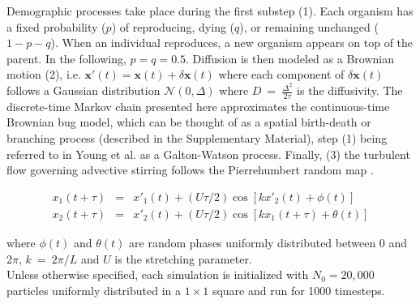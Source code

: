 Demographic processes take place during the first substep (1). Each organism has a fixed probability ($p$) of reproducing, dying ($q$), or remaining unchanged ($1-p-q$). When an individual reproduces, a new organism appears on top of the parent. In the following, $p=q=0.5$. Diffusion is then modeled as a Brownian motion (2), i.e. $\boldsymbol{x'}(t)=\boldsymbol{x}(t)+\delta\boldsymbol{x}(t)$ where each component of $\delta\boldsymbol{x}(t)$ follows a Gaussian distribution $\mathcal{N}(0,\Delta)$ where $D~=~\frac{\Delta^2}{2\tau}$ is the diffusivity. The discrete-time Markov chain presented here approximates the continuous-time Brownian bug model, which can be thought of as a spatial birth-death or branching process (described in the Supplementary Material), step (1) being referred to in Young et al. \cite{young_reproductive_2001} as a Galton-Watson process. Finally, (3) the turbulent flow governing advective stirring follows the Pierrehumbert random map \citep{pierrehumbert_tracer_1994}.

\begin{eqnarray}
 x_1(t+\tau)&=&x'_1(t)+(U\tau/2)\cos[kx'_2(t)+\phi(t)] \label{eq:map1} \\
 x_2(t+\tau)&=&x'_2(t)+(U\tau/2)\cos[kx_1(t+\tau)+\theta(t)] \label{eq:map2}
 \label{eq:pierrehumbert}
 \end{eqnarray}

 where $\phi(t)$ and $\theta(t)$ are random phases uniformly distributed between 0 and $2\pi$, $k~=~2\pi/L$ and $U$ is the stretching parameter. \\
 
Unless otherwise specified, each simulation is initialized with $N_0=20,000$ particles uniformly distributed in a $1\times 1$ square and run for 1000 timesteps. 
 
% 
% 
% 
